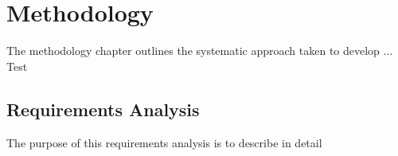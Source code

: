 \chapter{Methodology}\label{chap:meth}

The methodology chapter outlines the systematic approach taken to develop ...
Test
\section{Requirements Analysis}

The purpose of this requirements analysis is to describe in detail 